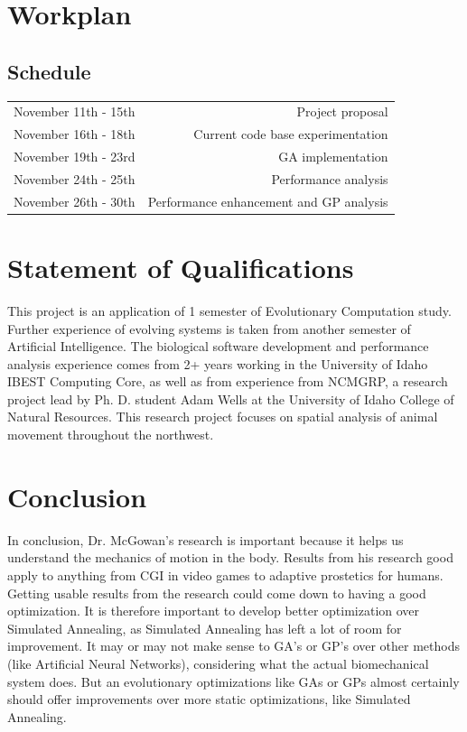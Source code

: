 \section{Workplan}

\subsection{Schedule}

\begin{tabular}{ l r }
  November 11th - 15th		& Project proposal \\
  November 16th - 18th 		& Current code base experimentation \\
  November 19th - 23rd 		& GA implementation\\
  November 24th - 25th 		& Performance analysis\\
  November 26th - 30th 		& Performance enhancement and GP analysis\\
	
\end{tabular}


\section{Statement of Qualifications}
This project is an application of 1 semester of Evolutionary Computation study.
Further experience of evolving systems is taken from another semester of 
Artificial Intelligence. The biological software development and performance
analysis experience comes from 2+ years working in the University of Idaho 
IBEST Computing Core, as well as from experience from NCMGRP, a research 
project lead by Ph. D. student Adam Wells at the University of Idaho College of 
Natural Resources. This research project focuses on spatial analysis of animal
movement throughout the northwest.

\section{Conclusion}
In conclusion, Dr. McGowan's research is important because it helps us
understand the mechanics of motion in the body. Results from his research
good apply to anything from CGI in video games to adaptive prostetics for
humans. Getting usable results from the research could come down to having 
a good optimization. It is therefore important to develop better optimization
over Simulated Annealing, as Simulated Annealing has left a lot of room for
improvement. It may or may not make sense to GA's or GP's over other methods
(like Artificial Neural Networks), considering what the actual biomechanical
system does. But an evolutionary optimizations like GAs or GPs almost 
certainly should offer improvements over more static optimizations, like
Simulated Annealing. 

